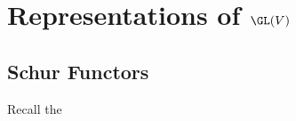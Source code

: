 \documentclass[../main.tex]{subfiles}
\begin{document}
\section{Representations of $ \GL(V) $}

\subsection{Schur Functors}

Recall the
\end{document}
